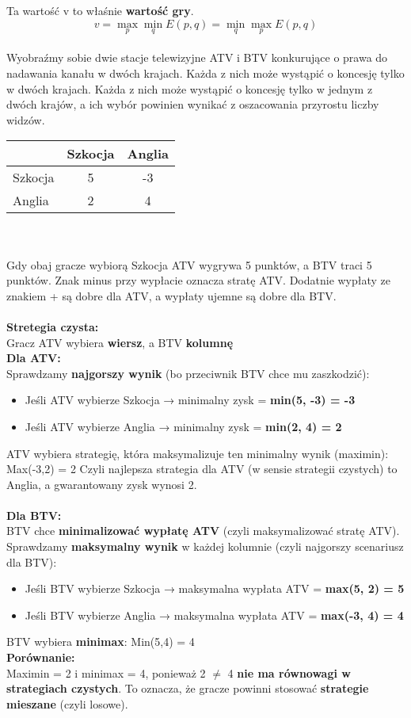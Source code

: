 \documentclass[12pt]{article}
\begin{document}
Ta wartość v to właśnie \textbf{wartość gry}.
\begin{equation}
\displaystyle v = \max_{p} \displaystyle \min_{q} E(p,q) = \displaystyle \min_{q} \displaystyle \max_{p} E(p,q)
\end{equation}
\\
Wyobraźmy sobie dwie stacje telewizyjne ATV i BTV konkurujące o prawa do nadawania kanału w dwóch krajach. Każda z nich może wystąpić o koncesję tylko w dwóch krajach. Każda z nich może wystąpić o koncesję tylko w jednym z dwóch krajów, a  ich wybór powinien wynikać z oszacowania przyrostu liczby widzów.
\begin{table}[h!]
\begin{center}
\begin{tabular}{|l|c|c|}
\hline
 & Szkocja & Anglia \\ \hline
Szkocja & 5 & -3 \\ \hline
Anglia & 2 & 4 \\ \hline
\end{tabular}
\end{center}
\end{table}
\\
\\
Gdy obaj gracze wybiorą Szkocja ATV wygrywa 5 punktów, a BTV traci 5 punktów. Znak minus przy wypłacie oznacza stratę ATV. Dodatnie wypłaty ze znakiem + są dobre dla ATV, a wypłaty ujemne są dobre dla BTV.
\\
\\
\textbf{Stretegia czysta:}
\\
Gracz ATV wybiera \textbf{wiersz}, a BTV \textbf{kolumnę}
\\ \textbf{Dla ATV:}
\\
Sprawdzamy\textbf{ najgorszy wynik} (bo przeciwnik BTV chce mu zaszkodzić):
\begin{itemize}
\item Jeśli ATV wybierze Szkocja → minimalny zysk = \textbf{min(5, -3) = -3}
\item Jeśli ATV wybierze Anglia → minimalny zysk =  \textbf{min(2, 4) = 2}
\end{itemize}
ATV wybiera strategię, która maksymalizuje ten minimalny wynik (maximin): Max(-3,2) = 2
Czyli najlepsza strategia dla ATV (w sensie strategii czystych) to Anglia,
a gwarantowany zysk wynosi 2.
\\
\\
\textbf{Dla BTV:}
\\
BTV chce \textbf{minimalizować wypłatę ATV} (czyli maksymalizować stratę ATV).
Sprawdzamy \textbf{maksymalny wynik} w każdej kolumnie (czyli najgorszy scenariusz dla BTV):
\begin{itemize}
\item Jeśli BTV wybierze Szkocja → maksymalna wypłata ATV = \textbf{max(5, 2) = 5}
\item Jeśli BTV wybierze Anglia → maksymalna wypłata ATV = \textbf{max(-3, 4) = 4}
\end{itemize}
BTV wybiera \textbf{minimax}: Min(5,4) = 4
\\
\textbf{Porównanie:}
\
\\
Maximin = 2 i minimax = 4,
ponieważ 2 $ \neq $ 4 \textbf{nie ma równowagi w strategiach czystych}.
To oznacza, że gracze powinni stosować \textbf{strategie mieszane} (czyli losowe).
\end{document}
